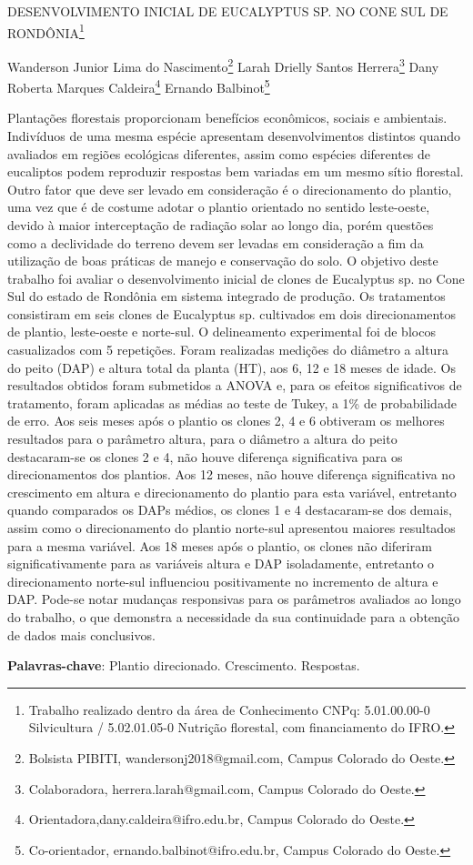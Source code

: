 \documentclass[article,12pt,onesidea,4paper,english,brazil]{abntex2}
\begin{document}
	
	
	\frenchspacing 
	
	\begin{center}
		\LARGE DESENVOLVIMENTO INICIAL DE EUCALYPTUS SP. NO CONE SUL DE RONDÔNIA\footnote{Trabalho realizado dentro da área de Conhecimento CNPq: 5.01.00.00-0 Silvicultura / 5.02.01.05-0	Nutrição florestal, com financiamento do IFRO.}
		
		\normalsize
		Wanderson Junior Lima do Nascimento\footnote{Bolsista PIBITI, wandersonj2018@gmail.com, Campus Colorado do Oeste.} 
		Larah Drielly Santos Herrera\footnote{Colaboradora, herrera.larah@gmail.com, Campus Colorado do Oeste.} 
		Dany Roberta Marques Caldeira\footnote{Orientadora,dany.caldeira@ifro.edu.br, Campus Colorado do Oeste.} 
		Ernando Balbinot\footnote{Co-orientador, ernando.balbinot@ifro.edu.br, Campus Colorado do Oeste.} 
	\end{center}
	
	\noindent Plantações florestais proporcionam benefícios econômicos, sociais e ambientais.
	Indivíduos de uma mesma espécie apresentam desenvolvimentos distintos quando
	avaliados em regiões ecológicas diferentes, assim como espécies diferentes de
	eucaliptos podem reproduzir respostas bem variadas em um mesmo sítio florestal.
	Outro fator que deve ser levado em consideração é o direcionamento do plantio,
	uma vez que é de costume adotar o plantio orientado no sentido leste-oeste, devido
	à maior interceptação de radiação solar ao longo dia, porém questões como a
	declividade do terreno devem ser levadas em consideração a fim da utilização de
	boas práticas de manejo e conservação do solo. O objetivo deste trabalho foi avaliar
	o desenvolvimento inicial de clones de Eucalyptus sp. no Cone Sul do estado de
	Rondônia em sistema integrado de produção. Os tratamentos consistiram em seis
	clones de Eucalyptus sp. cultivados em dois direcionamentos de plantio, leste-oeste
	e norte-sul. O delineamento experimental foi de blocos casualizados com 5
	repetições. Foram realizadas medições do diâmetro a altura do peito (DAP) e altura
	total da planta (HT), aos 6, 12 e 18 meses de idade. Os resultados obtidos foram
	submetidos a ANOVA e, para os efeitos significativos de tratamento, foram aplicadas
	as médias ao teste de Tukey, a 1\% de probabilidade de erro. Aos seis meses após o
	plantio os clones 2, 4 e 6 obtiveram os melhores resultados para o parâmetro altura,
	para o diâmetro a altura do peito destacaram-se os clones 2 e 4, não houve
	diferença significativa para os direcionamentos dos plantios. Aos 12 meses, não
	houve diferença significativa no crescimento em altura e direcionamento do plantio
	para esta variável, entretanto quando comparados os DAPs médios, os clones 1 e 4
	destacaram-se dos demais, assim como o direcionamento do plantio norte-sul
	apresentou maiores resultados para a mesma variável. Aos 18 meses após o
	plantio, os clones não diferiram significativamente para as variáveis altura e DAP
	isoladamente, entretanto o direcionamento norte-sul influenciou positivamente no
	incremento de altura e DAP. Pode-se notar mudanças responsivas para os
	parâmetros avaliados ao longo do trabalho, o que demonstra a necessidade da sua
	continuidade para a obtenção de dados mais conclusivos.
	
	\vspace{\onelineskip}
	
	\noindent
	\textbf{Palavras-chave}: Plantio direcionado. Crescimento. Respostas.
	
\end{document}
